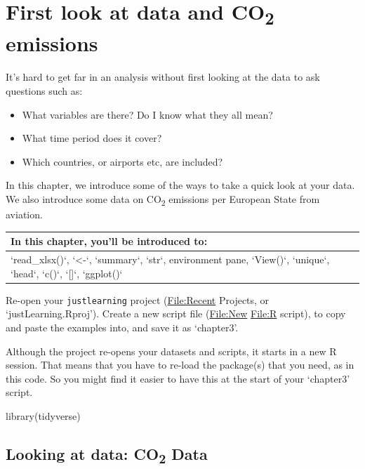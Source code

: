 \documentclass[
]{book}
\newenvironment{Shaded}{\begin{snugshade}}{\end{snugshade}}
\newcommand{\FunctionTok}[1]{\textcolor[rgb]{0.00,0.00,0.00}{#1}}
\newcommand{\NormalTok}[1]{#1}
\providecommand{\tightlist}{%
  \setlength{\itemsep}{0pt}\setlength{\parskip}{0pt}}
\begin{document}
\hypertarget{firstLook}{%
\chapter{\texorpdfstring{First look at data and CO\textsubscript{2} emissions}{First look at data and CO2 emissions}}\label{firstLook}}

It's hard to get far in an analysis without first looking at the data to ask questions such as:

\begin{itemize}
\tightlist
\item
  What variables are there? Do I know what they all mean?
\item
  What time period does it cover?
\item
  Which countries, or airports etc, are included?
\end{itemize}

In this chapter, we introduce some of the ways to take a quick look at your data. We also introduce some data on CO\textsubscript{2} emissions per European State from aviation.

\begin{tabular}{l}
\hline
In this chapter, you'll be introduced to:\\
\hline
`read\_xlsx()`, `<-`, `summary`, `str`, environment pane, `View()`, `unique`, `head`, `c()`, `[]`, `ggplot()`\\
\hline
\end{tabular}

Re-open your \texttt{justlearning} project (\url{File:Recent} Projects, or `justLearning.Rproj'). Create a new script file (\url{File:New} \url{File:R} script), to copy and paste the examples into, and save it as `chapter3'.

Although the project re-opens your datasets and scripts, it starts in a new R session. That means that you have to re-load the package(s) that you need, as in this code. So you might find it easier to have this at the start of your `chapter3' script.

\begin{Shaded}
\begin{Highlighting}[]
\FunctionTok{library}\NormalTok{(tidyverse) }
\end{Highlighting}
\end{Shaded}

\hypertarget{loadco2}{%
\section{\texorpdfstring{Looking at data: CO\textsubscript{2} Data}{Looking at data: CO2 Data}}\label{loadco2}}
\end{document}
